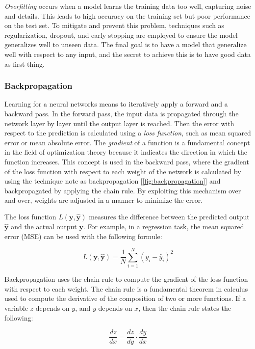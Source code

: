 \documentclass[../Thesis.tex]{subfiles}
\begin{document}
\emph{Overfitting} occurs when a model learns the training data too well, capturing noise and details. This leads to high accuracy on the training set but poor performance on the test set. To mitigate and prevent this problem, techniques such as regularization, dropout, and early stopping are employed to ensure the model generalizes well to unseen data. The final goal is to have a model that generalize well with respect to any input, and the secret to achieve this is to have good data as first thing.

	
	\subsubsection{Backpropagation}
	
	Learning for a neural networks means to iteratively apply a forward and a backward pass. In the forward pass, the input data is propagated through the network layer by layer until the output layer is reached. Then the error with respect to the prediction is calculated using a \emph{loss function}, such as mean squared error or mean absolute error. The \emph{gradient} of a function is a fundamental concept in the field of optimization theory because it indicates the direction in which the function increases. This concept is used in the backward pass, where the gradient of the loss function with respect to each weight of the network is calculated by using the technique note as backpropagation [\autoref{fig:backpropagation}] and backpropagated by applying the chain rule. By exploiting this mechanism over and over, weights are adjusted in a manner to minimize the error.
	
	The loss function \(L(\mathbf{y}, \mathbf{\hat{y}})\) measures the difference between the predicted output \(\mathbf{\hat{y}}\) and the actual output \(\mathbf{y}\). For example, in a regression task, the mean squared error (MSE) can be used with the following formule:
	
	\[
	L(\mathbf{y}, \mathbf{\hat{y}}) = \frac{1}{N} \sum_{i=1}^{N} (y_i - \hat{y}_i)^2
	\]
	
	Backpropagation uses the chain rule to compute the gradient of the loss function with respect to each weight. The chain rule is a fundamental theorem in calculus used to compute the derivative of the composition of two or more functions. If a variable \(z\) depends on \(y\), and \(y\) depends on \(x\), then the chain rule states the following:
	
	\[
	\frac{dz}{dx} = \frac{dz}{dy} \cdot \frac{dy}{dx}
	\]
	
\end{document}
